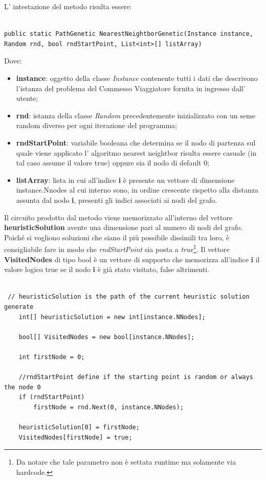 \documentclass[11pt]{article}
\begin{document}
L' intestazione del metodo risulta essere:

\begin{lstlisting}

public static PathGenetic NearestNeightborGenetic(Instance instance, Random rnd, bool rndStartPoint, List<int>[] listArray)

\end{lstlisting}


Dove:


\begin{itemize}
    \item \textbf{instance}: oggetto della classe \textit{Instance} contenente tutti i dati che descrivono l'istanza del problema del Commesso Viaggiatore fornita in ingresso dall' utente;
    \item \textbf{rnd}: istanza della classe \textit{Random} precedentemente inizializzato con un seme random diverso per ogni iterazione del programma;
    \item \textbf{rndStartPoint}: variabile booleana che determina se il nodo di partenza sul quale viene applicato l' algoritmo nearest neightbor risulta essere casuale (in tal caso assume il valore true) oppure sia il nodo di default 0;
    \item \textbf{listArray}: lista in cui all'indice \textbf{i} è presente un vettore di dimensione instance.Nnodes al cui interno sono, in ordine crescente rispetto alla distanza assunta dal nodo \textbf{i}, presenti gli indici associati ai nodi del grafo.
\end{itemize}

Il circuito prodotto dal metodo viene memorizzato all'interno del vettore \textbf{heuristicSolution} avente una dimensione pari al numero di nodi del grafo. Poiché si vogliono soluzioni che siano il più possibile dissimili tra loro, è consigliabile fare in modo che \textit{rndStartPoint} sia posta a \textit{true}\footnote{Da notare che tale parametro non è settata runtime ma solamente via hardcode.}. Il vettore \textbf{VisitedNodes} di tipo bool è un vettore di supporto che memorizza all'indice \textbf{i} il valore logico true se il nodo \textbf{i} è già stato visitato, false altrimenti.

\begin{lstlisting}

 // heuristicSolution is the path of the current heuristic solution generate
    int[] heuristicSolution = new int[instance.NNodes];

    bool[] VisitedNodes = new bool[instance.NNodes];

    int firstNode = 0;

    //rndStartPoint define if the starting point is random or always the node 0 
    if (rndStartPoint)
        firstNode = rnd.Next(0, instance.NNodes);

    heuristicSolution[0] = firstNode;
    VisitedNodes[firstNode] = true;

\end{lstlisting}
\end{document}
